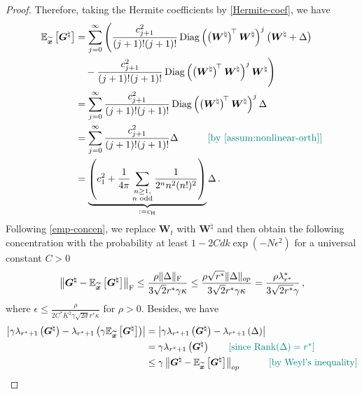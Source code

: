 \begin{proof}
Therefore, taking the Hermite coefficients by \cref{Hermite-coef}, we have
\begin{align}
    \mathbb{E}_{\widetilde{\bm x}}\left[\bm G^\natural\right] & = \sum_{j= 0}^{\infty}\Bigg(\frac{c_{j+1}^2}{(j+1)!(j+1)!}\operatorname{Diag}\left(\left(\bm W^\natural\right)^{\!\top}\bm W^\natural\right)^j \left(\bm W^\natural+\Delta\right)\\
    &\quad -\frac{c_{j+1}^2}{(j+1)!(j+1)!}\operatorname{Diag}\left(\left(\bm W^\natural\right)^{\!\top}\bm W^\natural\right)^j \bm W^\natural\Bigg)\nonumber\\
    & = \sum_{j= 0}^{\infty}\frac{c_{j+1}^2}{(j+1)!(j+1)!}\operatorname{Diag}\left(\left(\bm W^\natural\right)^{\!\top}\bm W^\natural\right)^j \Delta\nonumber\\
    & = \sum_{j= 0}^{\infty}\frac{c_{j+1}^2}{(j+1)!(j+1)!}\Delta\quad \tag*{\color{teal}[by \cref{assum:nonlinear-orth}]}\nonumber\\
    & = \underbrace{\left(c_1^2 + \frac{1}{4\pi}\sum_{\substack{n\geq 1, \\ n \text{ odd}}} \frac{1}{2^{n} n^2 (n!)^2}\right)}_{:=c_{\rm H}}\Delta\,. \label{eq:expectation-G}
\end{align}
Following \cref{emp-concen}, we replace $\bm W_t$ with $\bm W^\natural$ and then obtain the following concentration with the probability at least $1-2Cdk\operatorname{exp}(-N\epsilon^2)$ for a universal constant $C>0$
\begin{align*}
    \left\|\bm G^\natural - \mathbb{E}_{\widetilde{\bm x}}\left[\bm G^\natural\right]\right\|_{\rm F}\leq \frac{\rho\|\Delta\|_{\rm F}}{3\sqrt{2}r^*\gamma\kappa}\leq \frac{\rho\sqrt{r^*}\|\Delta\|_{op}}{3\sqrt{2}r^*\gamma\kappa}=\frac{\rho\lambda^*_{r^*}}{3\sqrt{2r^*}\gamma}\,,
\end{align*}
where $\epsilon \leq \frac{\rho}{2C^*K^2\gamma\sqrt{2d}r^*\kappa}$ for $\rho>0$. Besides, we have
\begin{align*}
    \left|\gamma\lambda_{r^*+1}\left(\bm G^\natural\right)-\lambda_{r^*+1}\left(\gamma\mathbb{E}_{\widetilde{\bm x}}\left[\bm G^\natural\right]\right)\right|&=\left|\gamma\lambda_{r^*+1}\left(\bm G^\natural\right)-\lambda_{r^*+1}\left(\Delta\right)\right|\\
    &=\gamma\lambda_{r^*+1}\left(\bm G^\natural\right) \tag*{\color{teal}[since $\operatorname{Rank}(\Delta)=r^*$]}\\
    &\leq \gamma\left\|\bm G^\natural - \mathbb{E}_{\widetilde{\bm x}}\left[\bm G^\natural\right]\right\|_{op}\quad \tag*{\color{teal}$\left[\text{by Weyl's inequality}\right]$}\\

\end{align*}
\end{proof}

